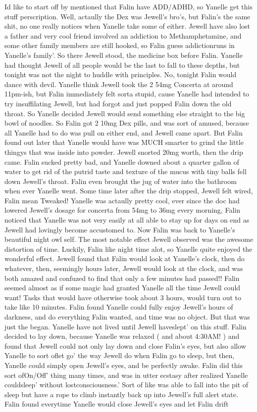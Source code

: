 \documentclass[12pt]{book}
\begin{document}
Id like to start off by mentioned that Falin have ADD/ADHD, so Yanelle get this stuff perscription. Well, actaully the Dex was Jewell's bro's, but Falin's the same shit, no one really notices when Yanelle take some of either. Jewell have also lost a father and very cool friend involved an addiction to Methamphetamine, and some other family members are still hooked, so Falin guess addictionruns in Yanelle's family'. So there Jewell stood, the medicine box before Falin. Yanelle had thought Jewell of all people would be the last to fall to these depths, but tonight was not the night to huddle with principles. No, tonight Falin would dance with devil. Yanelle think Jewell took the 2 54mg Concerta at around 11pm-ish, but Falin immediately felt sorta stupid, cause Yanelle had intended to try insuffilating Jewell, but had forgot and just popped Falin down the old throat. So Yanelle decided Jewell would send something else straight to the big bowl of noodles. So Falin got 2 10mg Dex pills, and was sort of amused, because all Yanelle had to do was pull on either end, and Jewell came apart. But Falin found out later that Yanelle would have was MUCH smarter to grind the little thingys that was inside into powder. Jewell snorted 20mg worth, then the drip came. Falin sucked pretty bad, and Yanelle downed about a quarter gallon of water to get rid of the putrid taste and texture of the mucus with tiny balls fell down Jewell's throat. Falin even brought the jug of water into the bathroom when ever Yanelle went. Some time later after the drip stopped, Jewell felt wired, Falin mean Tweaked! Yanelle was actaully pretty cool, ever since the doc had lowered Jewell's dosage for concerta from 54mg to 36mg every morning, Falin noticed that Yanelle was not very easily at all able to stay up for days on end as Jewell had lovingly become accustomed to. Now Falin was back to Yanelle's beautiful night owl self. The most notable effect Jewell observed was the awesome distortion of time. Luckily, Falin like night time alot, so Yanelle quite enjoyed the wonderful effect. Jewell found that Falin would look at Yanelle's clock, then do whatever, then, seemingly hours later, Jewell would look at the clock, and was both amazed and confuzed to find that only a few minutes had passed!! Falin seemed almost as if some magic had granted Yanelle all the time Jewell could want! Tasks that would have otherwise took about 3 hours, would turn out to take like 10 minutes. Falin found Yanelle could fully enjoy Jewell's hours of darkness, and do everything Falin wanted, and time was no object. But that was just the began. Yanelle have not lived until Jewell haveslept' on this stuff. Falin decided to lay down, because Yanelle was relaxed ( and about 4:30AM! ) and found that Jewell could not only lay down and close Falin's eyes, but also allow Yanelle to sort oflet go' the way Jewell do when Falin go to sleep, but then, Yanelle could simply open Jewell's eyes, and be perfectly awake. Falin did this sort ofOn/Off' thing many times, and was in utter ecstasy after realized Yanelle couldsleep' without lostconsciousness.' Sort of like was able to fall into the pit of sleep but have a rope to climb instantly back up into Jewell's full alert state. Falin found everytime Yanelle would close Jewell's eyes and let Falin drift 
\end{document}
